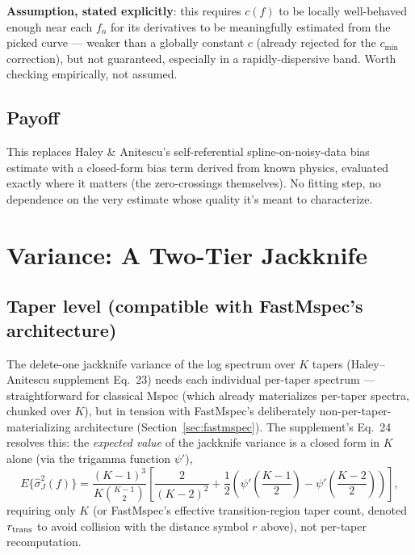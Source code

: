\documentclass[11pt]{article}
\begin{document}
\textbf{Assumption, stated explicitly}: this requires $c(f)$ to be locally well-behaved enough
near each $f_n$ for its derivatives to be meaningfully estimated from the picked curve --- weaker
than a globally constant $c$ (already rejected for the $c_{\min}$ correction), but not
guaranteed, especially in a rapidly-dispersive band. Worth checking empirically, not assumed.

\subsection{Payoff}

This replaces Haley \& Anitescu's self-referential spline-on-noisy-data bias estimate with a
closed-form bias term derived from known physics, evaluated exactly where it matters (the
zero-crossings themselves). No fitting step, no dependence on the very estimate whose quality
it's meant to characterize.

\section{Variance: A Two-Tier Jackknife}
\label{sec:variance}

\subsection{Taper level (compatible with FastMspec's architecture)}

The delete-one jackknife variance of the log spectrum over $K$ tapers (Haley--Anitescu
supplement Eq.~23) needs each individual per-taper spectrum --- straightforward for classical
Mspec (which already materializes per-taper spectra, chunked over $K$), but in tension with
FastMspec's deliberately non-per-taper-materializing architecture (Section~\ref{sec:fastmspec}).
The supplement's Eq.~24 resolves this: the \emph{expected value} of the jackknife variance is a
closed form in $K$ alone (via the trigamma function $\psi'$),
\begin{equation}
  E\{\hat\sigma_J^2(f)\} = \frac{(K-1)^3}{K\binom{K-1}{2}}\left[\frac{2}{(K-2)^2} +
  \frac12\left(\psi'\!\left(\frac{K-1}{2}\right) - \psi'\!\left(\frac{K-2}{2}\right)\right)\right],
  \label{eq:jk-expected}
\end{equation}
requiring only $K$ (or FastMspec's effective transition-region taper count, denoted $r_{\rm
trans}$ to avoid collision with the distance symbol $r$ above), not per-taper recomputation.
\end{document}
